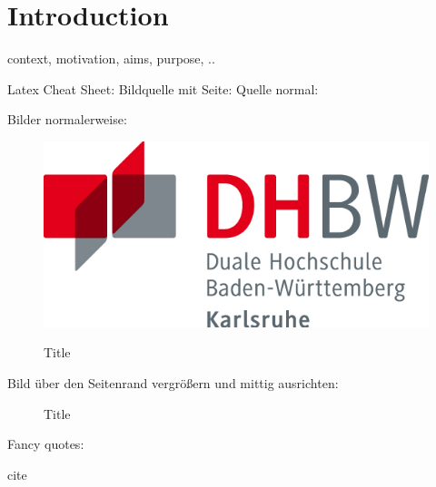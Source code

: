 \chapter{Introduction}
\label{ch:einleitung}

context, motivation, aims, purpose, ..

Latex Cheat Sheet:
Bildquelle mit Seite:%
Quelle normal: %

Bilder normalerweise:
\begin{figure}[htbp] 
	\centering
	\includegraphics[width=1.0\textwidth]{logos/dhbwLogo.png}
	\caption{Title}
	\cite{}
	\label{fig:label01}
\end{figure}
Bild über den Seitenrand vergrößern und mittig ausrichten:
\begin{figure}[htbp] 
	\centering
	\caption{Title}
	\cite{}
	\label{fig:labelName}
\end{figure}

Fancy quotes:
\begin{fquote}
	cite
\end{fquote}

